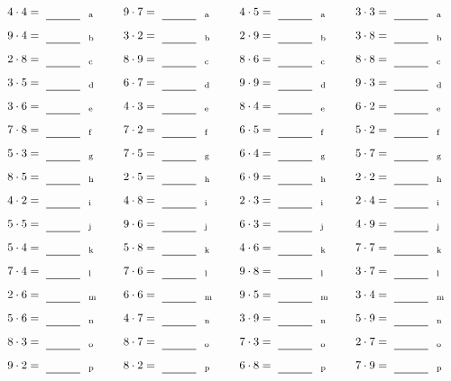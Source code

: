 \documentclass
[
  draft    = true,
  fontsize = 11pt,
  parskip  = half-
]
{scrartcl}
\begin{document}
\par\vfill\par
\begin{align*}
    \pline{4\cdot4}&=\rline{a}
  & \pline{9\cdot7}&=\rline{a}
  & \pline{4\cdot5}&=\rline{a}
  & \pline{3\cdot3}&=\rline{a} \\[1ex]
    \pline{9\cdot4}&=\rline{b}
  & \pline{3\cdot2}&=\rline{b}
  & \pline{2\cdot9}&=\rline{b}
  & \pline{3\cdot8}&=\rline{b} \\[1ex]
    \pline{2\cdot8}&=\rline{c}
  & \pline{8\cdot9}&=\rline{c}
  & \pline{8\cdot6}&=\rline{c}
  & \pline{8\cdot8}&=\rline{c} \\[1ex]
    \pline{3\cdot5}&=\rline{d}
  & \pline{6\cdot7}&=\rline{d}
  & \pline{9\cdot9}&=\rline{d}
  & \pline{9\cdot3}&=\rline{d} \\[1ex]
    \pline{3\cdot6}&=\rline{e}
  & \pline{4\cdot3}&=\rline{e}
  & \pline{8\cdot4}&=\rline{e}
  & \pline{6\cdot2}&=\rline{e} \\[1ex]
    \pline{7\cdot8}&=\rline{f}
  & \pline{7\cdot2}&=\rline{f}
  & \pline{6\cdot5}&=\rline{f}
  & \pline{5\cdot2}&=\rline{f} \\[1ex]
    \pline{5\cdot3}&=\rline{g}
  & \pline{7\cdot5}&=\rline{g}
  & \pline{6\cdot4}&=\rline{g}
  & \pline{5\cdot7}&=\rline{g} \\[1ex]
    \pline{8\cdot5}&=\rline{h}
  & \pline{2\cdot5}&=\rline{h}
  & \pline{6\cdot9}&=\rline{h}
  & \pline{2\cdot2}&=\rline{h} \\[1ex]
    \pline{4\cdot2}&=\rline{i}
  & \pline{4\cdot8}&=\rline{i}
  & \pline{2\cdot3}&=\rline{i}
  & \pline{2\cdot4}&=\rline{i} \\[1ex]
    \pline{5\cdot5}&=\rline{j}
  & \pline{9\cdot6}&=\rline{j}
  & \pline{6\cdot3}&=\rline{j}
  & \pline{4\cdot9}&=\rline{j} \\[1ex]
    \pline{5\cdot4}&=\rline{k}
  & \pline{5\cdot8}&=\rline{k}
  & \pline{4\cdot6}&=\rline{k}
  & \pline{7\cdot7}&=\rline{k} \\[1ex]
    \pline{7\cdot4}&=\rline{l}
  & \pline{7\cdot6}&=\rline{l}
  & \pline{9\cdot8}&=\rline{l}
  & \pline{3\cdot7}&=\rline{l} \\[1ex]
    \pline{2\cdot6}&=\rline{m}
  & \pline{6\cdot6}&=\rline{m}
  & \pline{9\cdot5}&=\rline{m}
  & \pline{3\cdot4}&=\rline{m} \\[1ex]
    \pline{5\cdot6}&=\rline{n}
  & \pline{4\cdot7}&=\rline{n}
  & \pline{3\cdot9}&=\rline{n}
  & \pline{5\cdot9}&=\rline{n} \\[1ex]
    \pline{8\cdot3}&=\rline{o}
  & \pline{8\cdot7}&=\rline{o}
  & \pline{7\cdot3}&=\rline{o}
  & \pline{2\cdot7}&=\rline{o} \\[1ex]
    \pline{9\cdot2}&=\rline{p}
  & \pline{8\cdot2}&=\rline{p}
  & \pline{6\cdot8}&=\rline{p}
  & \pline{7\cdot9}&=\rline{p}
\end{align*}
\end{document}
